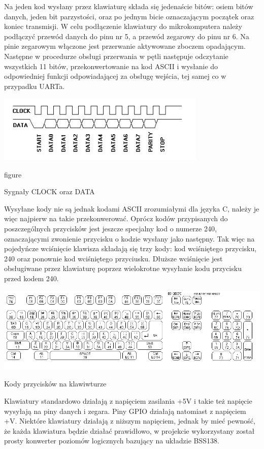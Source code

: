 \documentclass[shortabstract]{iithesis}
\begin{document}
Na jeden kod wysłany przez klawiaturę składa się jedenaście bitów: osiem bitów danych, jeden bit parzystości, oraz po jednym bicie oznaczającym początek oraz koniec transmisji. W celu podłączenie klawiatury do mikrokomputera należy podłączyć przewód danych do pinu nr 5, a przewód zegarowy do pinu nr 6. Na pinie zegarowym włączone jest przerwanie aktywowane zboczem opadającym. Następne w procedurze obsługi przerwania w pętli następuje odczytanie wszystkich 11 bitów, przekonwertowanie na kod ASCII i wysłanie do odpowiedniej funkcji odpowiadającej za obsługę wejścia, tej samej co w przypadku UARTa.

\begingroup
\centering
\includegraphics[width=0.75\textwidth]{signals.png}
\captionsetup{type=figure}
\caption{figure}{Sygnały CLOCK oraz DATA}
\endgroup

Wysyłane kody nie są jednak kodami ASCII zrozumiałymi dla języka C, należy je więc najpierw na takie przekonwerować. Oprócz kodów przypisanych do poszczególnych przycisków jest jeszcze specjalny kod o numerze 240, oznaczającymi zwonienie przycisku o kodzie wysłany jako następny. Tak więc na pojedyńcze wciśnięcie klawisza składają się trzy kody: kod wciśniętego przycisku, 240 oraz ponownie kod wciśniętego przyciusku. Dłuższe wciśnięcie jest obsługiwane przez klawiaturę poprzez wielokrotne wysyłanie kodu przycisku przed kodem 240.

\begingroup
\centering
\includegraphics[width=\textwidth]{scancode.png}
\captionsetup{type=figure}
\caption{Kody przycisków na klawiwturze}
\endgroup

Klawiatury standardowo działają z napięciem zasilania +5V i takie też napięcie wysyłają na piny danych i zegara. Piny GPIO działają natomiast z napięciem +V. Niektóre klawiatury działają z niższym napięciem, jednak by mieć pewność, że każda klawiatura będzie działać prawidłowo, w projekcie wykorzystany został prosty konwerter poziomów logicznych bazujący na układzie BSS138.
 
\end{document}
